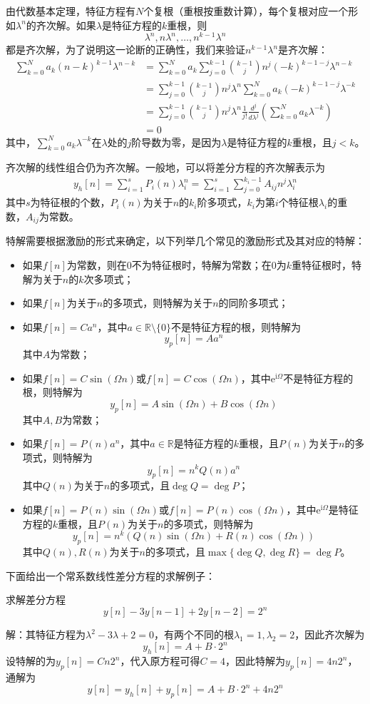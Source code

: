 由代数基本定理，特征方程有$N$个复根（重根按重数计算），每个复根对应一个形如$\lambda^n$的齐次解。如果$\lambda$是特征方程的$k$重根，则
$$\lambda^n,n\lambda^n,\dots,n^{k-1}\lambda^n$$
都是齐次解，为了说明这一论断的正确性，我们来验证$n^{k-1}\lambda^n$是齐次解：\begin{align*}
    \sum_{k=0}^{N}a_k (n-k)^{k-1}\lambda^{n-k}&=\sum_{k=0}^{N}a_k \sum_{j=0}^{k-1}\binom{k-1}{j}n^j(-k)^{k-1-j}\lambda^{n-k}\\
    &=\sum_{j=0}^{k-1}\binom{k-1}{j}n^j\lambda^n\sum_{k=0}^{N}a_k (-k)^{k-1-j}\lambda^{-k}\\
    &=\sum_{j=0}^{k-1}\binom{k-1}{j}n^j\lambda^n\frac{1}{j!}\frac{d^{j}}{d\lambda^{j}}\left(\sum_{k=0}^{N}a_k \lambda^{-k}\right)\\
    &=0
\end{align*}
其中，$\sum_{k=0}^{N}a_k \lambda^{-k}$在$\lambda$处的$j$阶导数为零，是因为$\lambda$是特征方程的$k$重根，且$j<k$。

齐次解的线性组合仍为齐次解。一般地，可以将差分方程的齐次解表示为
\begin{align*}
    y_h[n]=\sum_{i=1}^{s}P_i(n) \lambda_i^n=\sum_{i=1}^{s}\sum_{j=0}^{k_i-1}A_{ij} n^j \lambda_i^n
\end{align*}
其中$s$为特征根的个数，$P_i(n)$为关于$n$的$k_i$阶多项式，$k_i$为第$i$个特征根$\lambda_i$的重数，$A_{ij}$为常数。

特解需要根据激励的形式来确定，以下列举几个常见的激励形式及其对应的特解：
\begin{itemize}
    \item 如果$f[n]$为常数，则在$0$不为特征根时，特解为常数；在$0$为$k$重特征根时，特解为关于$n$的$k$次多项式；
    \item 如果$f[n]$为关于$n$的多项式，则特解为关于$n$的同阶多项式；
    \item 如果$f[n]=Ca^n$，其中$a\in\mathbb{R}\setminus \{0\}$不是特征方程的根，则特解为
    $$y_p[n]=Aa^n$$
    其中$A$为常数；
    \item 如果$f[n]=C\sin(\Omega n)$或$f[n]=C\cos(\Omega n)$，其中$\mathrm{e}^{\mathrm{i}\Omega}$不是特征方程的根，则特解为
    $$y_p[n]=A\sin(\Omega n)+B\cos(\Omega n)$$
    其中$A,B$为常数；
    \item 如果$f[n]=P(n)a^n$，其中$a\in\mathbb{R}$是特征方程的$k$重根，且$P(n)$为关于$n$的多项式，则特解为
    $$y_p[n]=n^k Q(n)a^n$$
    其中$Q(n)$为关于$n$的多项式，且$\deg Q=\deg P$；
    \item 如果$f[n]=P(n)\sin(\Omega n)$或$f[n]=P(n)\cos(\Omega n)$，其中$\mathrm{e}^{\mathrm{i}\Omega}$是特征方程的$k$重根，且$P(n)$为关于$n$的多项式，则特解为
    $$y_p[n]=n^k(Q(n)\sin(\Omega n)+R(n)\cos(\Omega n))$$
    其中$Q(n),R(n)$为关于$n$的多项式，且$\max\{\deg Q,\deg R\}=\deg P$。
\end{itemize}
下面给出一个常系数线性差分方程的求解例子：
\begin{example}
    求解差分方程
    $$y[n]-3y[n-1]+2y[n-2]=2^n$$

    解：其特征方程为$\lambda^2-3\lambda+2=0$，有两个不同的根$\lambda_1=1,\lambda_2=2$，因此齐次解为
    $$y_h[n]=A+B\cdot 2^n$$
    设特解的为$y_p[n]=C n 2^n$，代入原方程可得$C=4$，因此特解为$y_p[n]=4 n 2^n$，通解为
    \[y[n]=y_h[n]+y_p[n]=A+B\cdot 2^n+4 n 2^n\]
\end{example}


